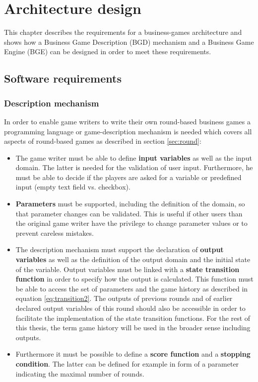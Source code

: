 \chapter{Architecture design}
\label{cha:architecture}

This chapter describes the requirements for a business-games architecture and shows how a Business Game Description (BGD) mechanism and a Business Game Engine (BGE) can be designed in order to meet these requirements.

\section{Software requirements}
\label{sec:requirements}

\subsection{Description mechanism}
\label{subsec:req:description}

In order to enable game writers to write their own round-based business games a programming language or game-description mechanism is needed which covers all aspects of round-based games as described in section \ref{sec:round}:
\begin{itemize}
\item The game writer must be able to define \textbf{input variables} as well as the input domain. The latter is needed for the validation of user input. Furthermore, he must be able to decide if the players are asked for a variable or predefined input (empty text field vs. checkbox).
\item \textbf{Parameters} must be supported, including the definition of the domain, so that parameter changes can be validated. This is useful if other users than the original game writer have the privilege to change parameter values or to prevent careless mistakes.
\item The description mechanism must support the declaration of \textbf{output variables} as well as the definition of the output domain and the initial state of the variable. Output variables must be linked with a \textbf{state transition function} in order to specify how the output is calculated. This function must be able to access the set of parameters and the game history as described in equation \ref{eq:transition2}. The outputs of previous rounds and of earlier declared output variables of this round should also be accessible in order to facilitate the implementation of the state transition functions. For the rest of this thesis, the term game history will be used in the broader sense including outputs. 
\item Furthermore it must be possible to define a \textbf{score function} and a \textbf{stopping condition}. The latter can be defined for example in form of a parameter indicating the maximal number of rounds.
\end{itemize}

